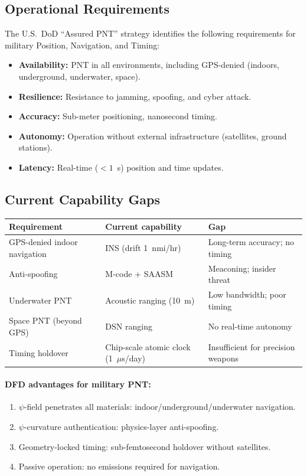 \documentclass[12pt,letterpaper]{article}
\begin{document}
\subsection{Operational Requirements}

The U.S.\ DoD ``Assured PNT'' strategy identifies the following
requirements for military Position, Navigation, and Timing:

\begin{itemize}
\item \textbf{Availability:} PNT in all environments, including
GPS-denied (indoors, underground, underwater, space).
\item \textbf{Resilience:} Resistance to jamming, spoofing, and
cyber attack.
\item \textbf{Accuracy:} Sub-meter positioning, nanosecond timing.
\item \textbf{Autonomy:} Operation without external infrastructure
(satellites, ground stations).
\item \textbf{Latency:} Real-time ($< 1$~s) position and time updates.
\end{itemize}

\subsection{Current Capability Gaps}

\begin{longtable}{@{}p{4cm}p{4cm}p{5cm}@{}}
\toprule
Requirement & Current capability & Gap \\
\midrule
\endhead
GPS-denied indoor navigation & INS (drift 1~nmi/hr) & Long-term
accuracy; no timing \\
Anti-spoofing & M-code + SAASM & Meaconing; insider threat \\
Underwater PNT & Acoustic ranging (10~m) & Low bandwidth; poor timing \\
Space PNT (beyond GPS) & DSN ranging & No real-time autonomy \\
Timing holdover & Chip-scale atomic clock (1~$\mu$s/day) & Insufficient
for precision weapons \\
\bottomrule
\end{longtable}

\paragraph{DFD advantages for military PNT:}
\begin{enumerate}
\item $\psi$-field penetrates all materials: indoor/underground/underwater
navigation.
\item $\psi$-curvature authentication: physics-layer anti-spoofing.
\item Geometry-locked timing: sub-femtosecond holdover without satellites.
\item Passive operation: no emissions required for navigation.
\end{enumerate}
\end{document}
